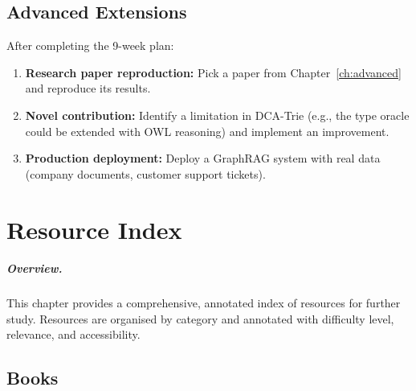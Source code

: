 \documentclass[11pt,a4paper,oneside,openany]{book}
\theoremstyle{definition}
\theoremstyle{plain}
\theoremstyle{remark}
\begin{document}
\section{Advanced Extensions}\label{sec:extensions}

After completing the 9-week plan:
\begin{enumerate}
	\item \textbf{Research paper reproduction:} Pick a paper from Chapter~\ref{ch:advanced} and reproduce its results.
	\item \textbf{Novel contribution:} Identify a limitation in DCA-Trie (e.g., the type oracle could be extended with OWL reasoning) and implement an improvement.
	\item \textbf{Production deployment:} Deploy a GraphRAG system with real data (company documents, customer support tickets).
\end{enumerate}

\chapter{Resource Index}\label{ch:resources}

\paragraph{Overview.}
This chapter provides a comprehensive, annotated index of resources for further study. Resources are organised by category and annotated with difficulty level, relevance, and accessibility.

\section{Books}\label{sec:res-books}
\end{document}
